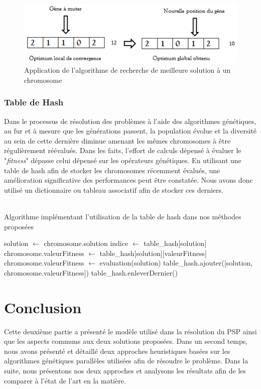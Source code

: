 	\begin{figure}[!h]
		\begin{center}
			\includegraphics[scale=.6]{images/local_search_fig.png}
			\caption{Application de l'algorithme de recherche de meilleure solution à un chromosome}
			\label{fig:local_search_fig}
		\end{center}
	\end{figure} 
	
	\subsubsection{Table de Hash}
	Dans le processus de résolution des problèmes à l'aide des algorithmes génétiques, au fur et à mesure que les générations passent, la population évolue et la diversité au sein de cette dernière diminue amenant les mêmes chromosomes à être régulièrement réévalués. Dans les faits, l'effort de calculs dépensé à évaluer le "\emph{fitness}" dépasse celui dépensé sur les opérateurs génétiques. En utilisant une table de hash afin de stocker les chromosomes récemment évalués, une amélioration significative des performances peut être constatée. Nous avons donc utilisé un dictionnaire ou tableau associatif afin de stocker ces derniers. \\
	\\
	\begin{algorithm}[H]
 		\caption{Algorithme implémentant l'utilisation de la table de hash dans nos méthodes proposées}
 		\label{alg:table_hash}
 		\BlankLine
 		
 		solution $\gets$ chromosome.solution\;
 		{
 			indice $\gets$ table\_hash[solution] \;
 			chromosome.valeurFitness $\gets$ table\_hash[solution][valeurFitness] \;
 		}
 		{
			chromosome.valeurFitness  $\gets$ evaluation(solution) \;
			table\_hash.ajouter([solution, chromosome.valeurFitness])\;	
			{
				table\_hash.enleverDernier() \;
			}
 		}
 	
	\end{algorithm}
	
	\section*{Conclusion}
	Cette deuxième partie a présenté le modèle utilisé dans la résolution du PSP ainsi que les aspects communs aux deux solutions proposées. Dans un second temps, nous avons présenté et détaillé deux approches heuristiques basées sur les algorithmes génétiques parallèles utilisées afin de résoudre le problème. Dans la suite, nous présentons nos deux approches et analysons les résultats afin de les comparer à l'état de l'art en la matière.
